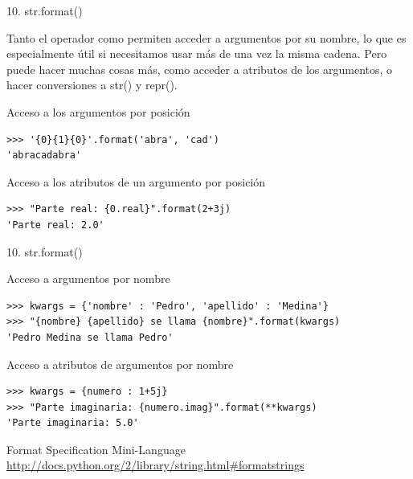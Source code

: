 \documentclass[14pt]{beamer}
\begin{document}
\begin{frame}[fragile]{10. str.format()}
  \small
  \begin{block}{}
    \centering
    Tanto el operador \structure{\%} como 
    permiten acceder a argumentos por su nombre, lo que es
    especialmente útil si necesitamos usar más de una vez la misma
    cadena. Pero  puede hacer muchas cosas
    más, como acceder a atributos de los argumentos, o hacer
    conversiones a str() y repr().
  \end{block}

  \footnotesize
  \begin{exampleblock}
    {Acceso a los argumentos por posición}
    \begin{lstlisting}
>>> '{0}{1}{0}'.format('abra', 'cad')
'abracadabra'
    \end{lstlisting}
  \end{exampleblock}

  \begin{exampleblock}
    {Acceso a los atributos de un argumento por posición}
    \begin{lstlisting}
>>> "Parte real: {0.real}".format(2+3j)
'Parte real: 2.0'
    \end{lstlisting}
  \end{exampleblock}
\end{frame}

\begin{frame}[fragile]{10. str.format()}
  \footnotesize
  \begin{exampleblock}
    {Acceso a argumentos por nombre}
    \scriptsize
    \begin{lstlisting}
>>> kwargs = {'nombre' : 'Pedro', 'apellido' : 'Medina'}
>>> "{nombre} {apellido} se llama {nombre}".format(kwargs)
'Pedro Medina se llama Pedro'
    \end{lstlisting}
  \end{exampleblock}

  \begin{exampleblock}
    {Acceso a atributos de argumentos por nombre}
    \scriptsize
    \begin{lstlisting}
>>> kwargs = {numero : 1+5j}
>>> "Parte imaginaria: {numero.imag}".format(**kwargs)
'Parte imaginaria: 5.0'
    \end{lstlisting}
  \end{exampleblock}

  \small
  \begin{block}
    {\centering Format Specification Mini-Language}
    \footnotesize
    \centering
    \url{http://docs.python.org/2/library/string.html#formatstrings}
  \end{block}
\end{frame}
\end{document}
